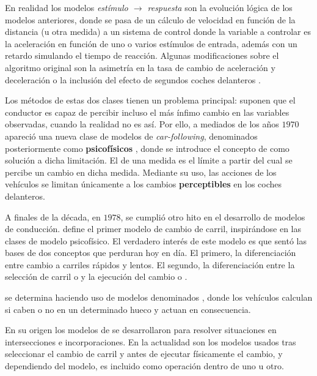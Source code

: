 En realidad los modelos \textit{estímulo $\rightarrow$ respuesta} son la evolución lógica de los modelos anteriores, donde se pasa de un cálculo de velocidad en función de la distancia (u otra medida) a un sistema de control donde la variable a controlar es la aceleración en función de uno o varios estímulos de entrada, además con un retardo simulando el tiempo de reacción. Algunas modificaciones sobre el algoritmo original son la asimetría en la tasa de cambio de aceleración y deceleración \cite{Gazis1959} o la inclusión del efecto de segundos coches delanteros \cite{Bexelius1968}.

Los métodos de estas dos clases tienen un problema principal: suponen que el conductor es capaz de percibir incluso el más ínfimo cambio en las variables observadas, cuando la realidad no es así. Por ello, a mediados de los años $1970$ apareció una nueva clase de modelos de \textit{\gls{car-following}}, denominados posteriormente como \textbf{psicofísicos} \cite{wiedemann1974simulation}, donde se introduce el concepto de \textit{} como solución a dicha limitación. El \textit{} de una medida es el límite a partir del cual se percibe un cambio en dicha medida. Mediante su uso, las acciones de los vehículos se limitan únicamente a los cambios \textbf{perceptibles} en los coches delanteros.

A finales de la década, en $1978$, se cumplió otro hito en el desarrollo de modelos de conducción. \cite{Sparmann1978} define el primer modelo de cambio de carril, inspirándose en las clases de modelo psicofísico. El verdadero interés de este modelo es que sentó las bases de dos conceptos que perduran hoy en día. El primero, la diferenciación entre cambio a carriles rápidos y lentos. El segundo, la diferenciación entre la selección de carril o \textit{} y la ejecución del cambio o \textit{}.

 se determina haciendo uso de modelos denominados \textit{}, donde los vehículos calculan si caben o no en un determinado hueco y actuan en consecuencia.

En su origen los modelos de \textit{} se desarrollaron para resolver situaciones en intersecciones e incorporaciones. En la actualidad son los modelos usados tras seleccionar el cambio de carril y antes de ejecutar físicamente el cambio, y dependiendo del modelo, es incluido como operación dentro de uno u otro.

